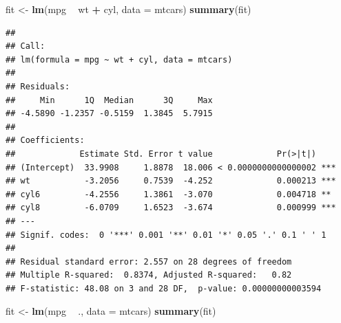 \documentclass[
  12pt,
]{book}
\newenvironment{Shaded}{\begin{snugshade}}{\end{snugshade}}
\newcommand{\DataTypeTok}[1]{\textcolor[rgb]{0.13,0.29,0.53}{#1}}
\newcommand{\KeywordTok}[1]{\textcolor[rgb]{0.13,0.29,0.53}{\textbf{#1}}}
\newcommand{\NormalTok}[1]{#1}
\newcommand{\OperatorTok}[1]{\textcolor[rgb]{0.81,0.36,0.00}{\textbf{#1}}}
\newcommand{\StringTok}[1]{\textcolor[rgb]{0.31,0.60,0.02}{#1}}
\theoremstyle{definition}
\theoremstyle{definition}
\theoremstyle{definition}
\theoremstyle{remark}
\begin{document}
\begin{Shaded}
\begin{Highlighting}[]
\NormalTok{fit <-}\StringTok{ }\KeywordTok{lm}\NormalTok{(mpg }\OperatorTok{~}\StringTok{ }\NormalTok{wt }\OperatorTok{+}\StringTok{ }\NormalTok{cyl, }\DataTypeTok{data =}\NormalTok{ mtcars)}
\KeywordTok{summary}\NormalTok{(fit)}
\end{Highlighting}
\end{Shaded}

\begin{verbatim}
## 
## Call:
## lm(formula = mpg ~ wt + cyl, data = mtcars)
## 
## Residuals:
##     Min      1Q  Median      3Q     Max 
## -4.5890 -1.2357 -0.5159  1.3845  5.7915 
## 
## Coefficients:
##             Estimate Std. Error t value             Pr(>|t|)    
## (Intercept)  33.9908     1.8878  18.006 < 0.0000000000000002 ***
## wt           -3.2056     0.7539  -4.252             0.000213 ***
## cyl6         -4.2556     1.3861  -3.070             0.004718 ** 
## cyl8         -6.0709     1.6523  -3.674             0.000999 ***
## ---
## Signif. codes:  0 '***' 0.001 '**' 0.01 '*' 0.05 '.' 0.1 ' ' 1
## 
## Residual standard error: 2.557 on 28 degrees of freedom
## Multiple R-squared:  0.8374, Adjusted R-squared:   0.82 
## F-statistic: 48.08 on 3 and 28 DF,  p-value: 0.00000000003594
\end{verbatim}

\begin{Shaded}
\begin{Highlighting}[]
\NormalTok{fit <-}\StringTok{ }\KeywordTok{lm}\NormalTok{(mpg }\OperatorTok{~}\StringTok{ }\NormalTok{., }\DataTypeTok{data =}\NormalTok{ mtcars)}
\KeywordTok{summary}\NormalTok{(fit)}
\end{Highlighting}
\end{Shaded}
\end{document}
